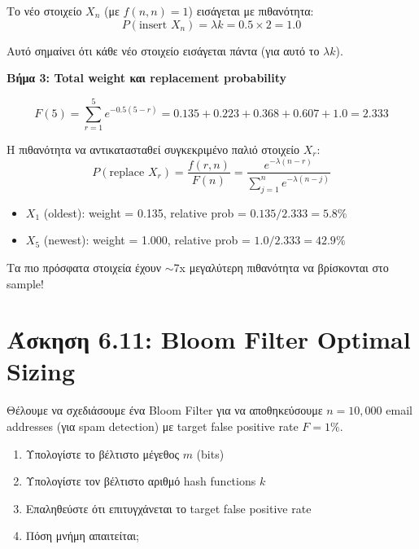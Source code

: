 Το νέο στοιχείο $X_n$ (με $f(n,n) = 1$) εισάγεται με πιθανότητα:
$$P(\text{insert } X_n) = \lambda k = 0.5 \times 2 = 1.0$$

Αυτό σημαίνει ότι κάθε νέο στοιχείο εισάγεται πάντα (για αυτό το $\lambda k$).

\textbf{Βήμα 3: Total weight και replacement probability}

$$F(5) = \sum_{r=1}^{5} e^{-0.5(5-r)} = 0.135 + 0.223 + 0.368 + 0.607 + 1.0 = 2.333$$

Η πιθανότητα να αντικατασταθεί συγκεκριμένο παλιό στοιχείο $X_r$:
$$P(\text{replace } X_r) = \frac{f(r, n)}{F(n)} = \frac{e^{-\lambda(n-r)}}{\sum_{j=1}^{n} e^{-\lambda(n-j)}}$$

\begin{warningbox}
\begin{itemize}
    \item $X_1$ (oldest): weight = 0.135, relative prob = $0.135/2.333 = 5.8\%$
    \item $X_5$ (newest): weight = 1.000, relative prob = $1.0/2.333 = 42.9\%$
\end{itemize}
Τα πιο πρόσφατα στοιχεία έχουν $\sim$7x μεγαλύτερη πιθανότητα να βρίσκονται στο sample!
\end{warningbox}

\section{Άσκηση 6.11: Bloom Filter Optimal Sizing}

\begin{formulabox}[Εκφώνηση]
Θέλουμε να σχεδιάσουμε ένα Bloom Filter για να αποθηκεύσουμε $n = 10{,}000$
email addresses (για spam detection) με target false positive rate $F = 1\%$.

\begin{enumerate}
    \item Υπολογίστε το βέλτιστο μέγεθος $m$ (bits)
    \item Υπολογίστε τον βέλτιστο αριθμό hash functions $k$
    \item Επαληθεύστε ότι επιτυγχάνεται το target false positive rate
    \item Πόση μνήμη απαιτείται;
\end{enumerate}
\end{formulabox}

